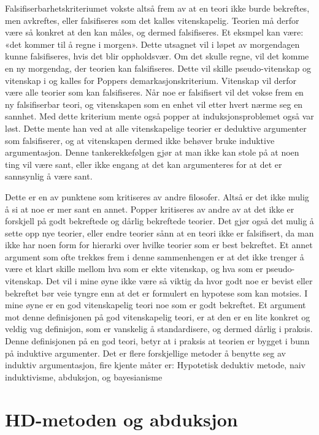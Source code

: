 \documentclass[
]{book}
\begin{document}
Falsifiserbarhetskriteriumet vokste altså frem av at en teori ikke burde bekreftes, men avkreftes, eller falsifiseres som det kalles vitenskapelig. Teorien må derfor være så konkret at den kan måles, og dermed falsifiseres. Et eksmpel kan være: «det kommer til å regne i morgen». Dette utsagnet vil i løpet av morgendagen kunne falsifiseres, hvis det blir oppholdsvær. Om det skulle regne, vil det komme en ny morgendag, der teorien kan falsifiseres. Dette vil skille pseudo-vitenskap og vitenskap i og kalles for Poppers demarkasjonskriterium. Vitenskap vil derfor være alle teorier som kan falsifiseres. Når noe er falsifisert vil det vokse frem en ny falsifiserbar teori, og vitenskapen som en enhet vil etter hvert nærme seg en sannhet. Med dette kriterium mente også popper at induksjonsproblemet også var løst. Dette mente han ved at alle vitenskapelige teorier er deduktive argumenter som falsifiserer, og at vitenskapen dermed ikke behøver bruke induktive argumentasjon. Denne tankerekkefølgen gjør at man ikke kan stole på at noen ting vil være sant, eller ikke engang at det kan argumenteres for at det er sannsynlig å være sant.

Dette er en av punktene som kritiseres av andre filosofer. Altså er det ikke mulig å si at noe er mer sant en annet. Popper kritiseres av andre av at det ikke er forskjell på godt bekreftede og dårlig bekreftede teorier. Det gjør også det mulig å sette opp nye teorier, eller endre teorier sånn at en teori ikke er falsifisert, da man ikke har noen form for hierarki over hvilke teorier som er best bekreftet. Et annet argument som ofte trekkes frem i denne sammenhengen er at det ikke trenger å være et klart skille mellom hva som er ekte vitenskap, og hva som er pseudo-vitenskap. Det vil i mine øyne ikke være så viktig da hvor godt noe er bevist eller bekreftet bør veie tyngre enn at det er formulert en hypotese som kan motsies. I mine øyne er en god vitenskapelig teori noe som er godt bekreftet. Et argument mot denne definisjonen på god vitenskapelig teori, er at den er en lite konkret og veldig vag definisjon, som er vanskelig å standardisere, og dermed dårlig i praksis. Denne definisjonen på en god teori, betyr at i praksis at teorien er bygget i bunn på induktive argumenter. Det er flere forskjellige metoder å benytte seg av induktiv argumentasjon, fire kjente måter er: Hypotetisk deduktiv metode, naiv induktivisme, abduksjon, og bayesianisme\\

\hypertarget{hd-metoden-og-abduksjon}{%
\section{HD-metoden og abduksjon}\label{hd-metoden-og-abduksjon}}
\end{document}
